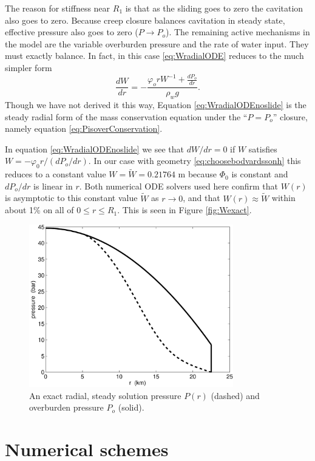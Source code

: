\documentclass[gmd]{copernicus}   %
\begin{document}
The reason for stiffness near $R_1$ is that as the sliding goes to zero the cavitation also goes to zero.  Because creep closure balances cavitation in steady state, effective pressure also goes to zero ($P\to P_o$).  The remaining active mechanisms in the model are the variable overburden pressure and the rate of water input.  They must exactly balance.  In fact, in this case \eqref{eq:WradialODE} reduces to the much simpler form
\begin{equation}
\frac{dW}{dr} = - \frac{\varphi_o r W^{-1} + \frac{dP_o}{dr}}{\rho_w g}. \label{eq:WradialODEnoslide}
\end{equation}
Though we have not derived it this way, Equation \eqref{eq:WradialODEnoslide} is the steady radial form of the mass conservation equation under the ``$P=P_o$'' closure, namely equation \eqref{eq:PisoverConservation}.

In equation \eqref{eq:WradialODEnoslide} we see that $dW/dr=0$ if $W$ satisfies $W = - \varphi_0 r / (dP_o/dr)$.  In our case with geometry \eqref{eq:choosebodvardssonh} this reduces to a constant value $W=\tilde W= 0.21764$ m because $\Phi_0$ is constant and $dP_o/dr$ is linear in $r$.  Both numerical ODE solvers used here confirm that $W(r)$ is asymptotic to this constant value $\tilde W$ as $r\to 0$, and that $W(r)\approx \tilde W$ within about 1\% on all of $0\le r \le R_1$.  This is seen in Figure \ref{fig:Wexact}.

\begin{figure}[ht]
\includegraphics[width=3.5in,keepaspectratio=true]{exact-P-plot}
\caption{An exact radial, steady solution pressure $P(r)$ (dashed) and overburden pressure $P_o$ (solid).}
\label{fig:Pexact}
\end{figure}


\section{Numerical schemes}  \label{sec:num}
\end{document}
